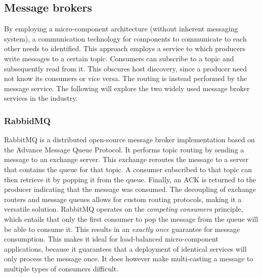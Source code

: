 \subsection{Message brokers}
By employing a micro-component architecture (without inherent messaging system), a communication technology for components to communicate to each other needs to identified. This approach employs a service to which producers write messages to a certain topic. Consumers can subscribe to a topic and subsequently read from it. This obscures host discovery, since a producer need not know its consumers or vice versa. The routing is instead performed by the message service. The following will explore the two widely used message broker services in the industry.

\subsubsection*{RabbidMQ}
RabbitMQ \cite{web:rabbitmq} is a distributed open-source message broker implementation based on the Advance Message Queue Protocol. It performs topic routing by sending a message to an exchange server. This exchange reroutes the message to a server that contains the queue for that topic. A consumer subscribed to that topic can then retrieve it by popping it from the queue. Finally, an ACK is returned to the producer indicating that the message was consumed. The decoupling of exchange routers and message queues allows for custom routing protocols, making it a versatile solution. RabbitMQ operates on the \emph{competing consumers} principle, which entails that only the first consumer to pop the message from the queue will be able to consume it. This results in an \emph{exactly once} guarantee for message consumption. This makes it ideal for load-balanced micro-component applications, because it guarantees that a deployment of identical services will only process the message once. It does however make multi-casting a message to multiple types of consumers difficult.

